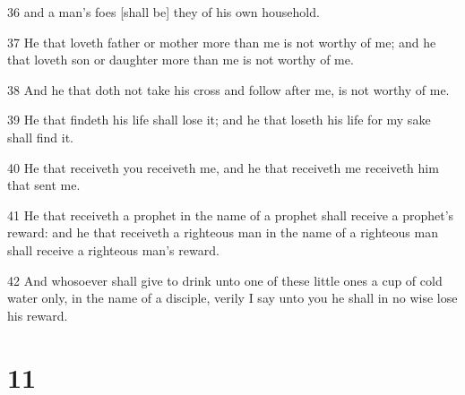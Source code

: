 \par 36 and a man's foes [shall be] they of his own household.
\par 37 He that loveth father or mother more than me is not worthy of me; and he that loveth son or daughter more than me is not worthy of me.
\par 38 And he that doth not take his cross and follow after me, is not worthy of me.
\par 39 He that findeth his life shall lose it; and he that loseth his life for my sake shall find it.
\par 40 He that receiveth you receiveth me, and he that receiveth me receiveth him that sent me.
\par 41 He that receiveth a prophet in the name of a prophet shall receive a prophet's reward: and he that receiveth a righteous man in the name of a righteous man shall receive a righteous man's reward.
\par 42 And whosoever shall give to drink unto one of these little ones a cup of cold water only, in the name of a disciple, verily I say unto you he shall in no wise lose his reward.

\chapter{11}

